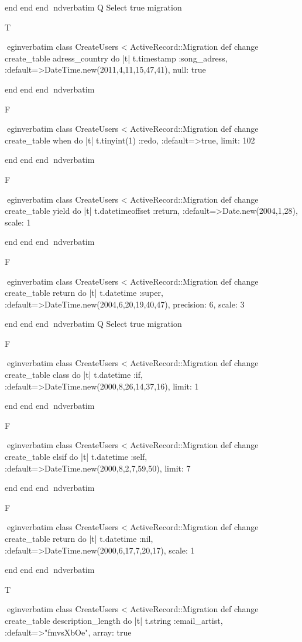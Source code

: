     end 
  end 
end
nd{verbatim}
Q
 Select true migration

T

egin{verbatim}
 class CreateUsers < ActiveRecord::Migration 
  def change 
    create_table adress_country do |t| 
      t.timestamp :song_adress, :default=>DateTime.new(2011,4,11,15,47,41), null: true
    
    end 
  end 
end
nd{verbatim}

F

egin{verbatim}
 class CreateUsers < ActiveRecord::Migration 
  def change 
    create_table when do |t| 
      t.tinyint(1) :redo, :default=>true, limit: 102
    
    end 
  end 
end
nd{verbatim}

F

egin{verbatim}
 class CreateUsers < ActiveRecord::Migration 
  def change 
    create_table yield do |t| 
      t.datetimeoffset :return, :default=>Date.new(2004,1,28), scale: 1
    
    end 
  end 
end
nd{verbatim}

F

egin{verbatim}
 class CreateUsers < ActiveRecord::Migration 
  def change 
    create_table return do |t| 
      t.datetime :super, :default=>DateTime.new(2004,6,20,19,40,47), precision: 6, scale: 3
    
    end 
  end 
end
nd{verbatim}
Q
 Select true migration

F

egin{verbatim}
 class CreateUsers < ActiveRecord::Migration 
  def change 
    create_table class do |t| 
      t.datetime :if, :default=>DateTime.new(2000,8,26,14,37,16), limit: 1
    
    end 
  end 
end
nd{verbatim}

F

egin{verbatim}
 class CreateUsers < ActiveRecord::Migration 
  def change 
    create_table elsif do |t| 
      t.datetime :self, :default=>DateTime.new(2000,8,2,7,59,50), limit: 7
    
    end 
  end 
end
nd{verbatim}

F

egin{verbatim}
 class CreateUsers < ActiveRecord::Migration 
  def change 
    create_table return do |t| 
      t.datetime :nil, :default=>DateTime.new(2000,6,17,7,20,17), scale: 1
    
    end 
  end 
end
nd{verbatim}

T

egin{verbatim}
 class CreateUsers < ActiveRecord::Migration 
  def change 
    create_table description_length do |t| 
      t.string :email_artist, :default=>"fmvsXbOe", array: true
    
